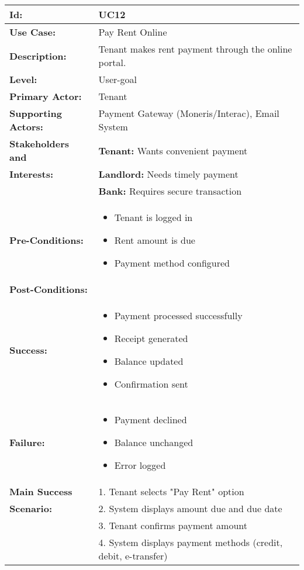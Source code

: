\documentclass[12pt]{article}
\begin{document}
\begin{tabular}{|p{3cm}|p{11cm}|}
\hline
\textbf{Id:} & UC12 \\
\hline
\textbf{Use Case:} & Pay Rent Online \\
\hline
\textbf{Description:} & Tenant makes rent payment through the online portal. \\
\hline
\textbf{Level:} & User-goal \\
\hline
\textbf{Primary Actor:} & Tenant \\
\hline
\textbf{Supporting Actors:} & Payment Gateway (Moneris/Interac), Email System \\
\hline
\textbf{Stakeholders and} & \textbf{Tenant:} Wants convenient payment \\
\textbf{Interests:} & \textbf{Landlord:} Needs timely payment \\
& \textbf{Bank:} Requires secure transaction \\
\hline
\textbf{Pre-Conditions:} & 
\begin{itemize}
    \item Tenant is logged in
    \item Rent amount is due
    \item Payment method configured
\end{itemize} \\
\hline
\textbf{Post-Conditions:} & \\
\textbf{Success:} & 
\begin{itemize}
    \item Payment processed successfully
    \item Receipt generated
    \item Balance updated
    \item Confirmation sent
\end{itemize} \\
\textbf{Failure:} & 
\begin{itemize}
    \item Payment declined
    \item Balance unchanged
    \item Error logged
\end{itemize} \\
\hline
\textbf{Main Success} & 1. Tenant selects "Pay Rent" option \\
\textbf{Scenario:} & 2. System displays amount due and due date \\
& 3. Tenant confirms payment amount \\
& 4. System displays payment methods (credit, debit, e-transfer) \\

\end{tabular}
\end{document}

